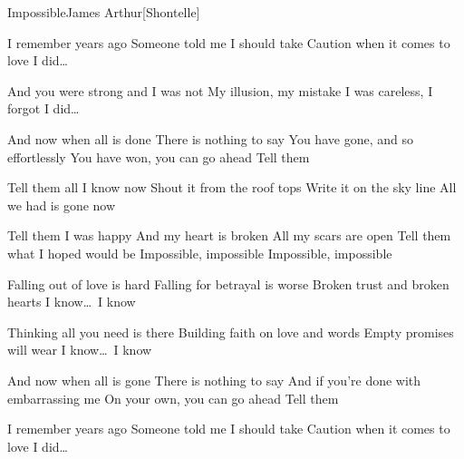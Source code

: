 \begin{Song}{Impossible}{James Arthur}[Shontelle]
\begin{multicols}{2}
\begin{Verse}
I remember years ago
Someone told me I should take
Caution when it comes to love
I did\dots\
\espaceInterStrophe

And you were strong and I was not
My illusion, my mistake
I was careless, I forgot
I did\dots\
\end{Verse}
\espaceInterStrophe

\begin{PreChorus}
And now when all is done
There is nothing to say
You have gone, and so effortlessly
You have won, you can go ahead
Tell them
\end{PreChorus}
\espaceInterStrophe

\begin{Chorus}
Tell them all I know now
Shout it from the roof tops
Write it on the sky line
All we had is gone now
\espaceInterStrophe

Tell them I was happy
And my heart is broken
All my scars are open
Tell them what I hoped would be
Impossible, impossible
Impossible, impossible
\end{Chorus}
\columnbreak

\begin{Verse}
Falling out of love is hard
Falling for betrayal is worse
Broken trust and broken hearts
I know\dots\ I know
\espaceInterStrophe

Thinking all you need is there
Building faith on love and words
Empty promises will wear
I know\dots\ I know
\end{Verse}
\espaceInterStrophe

\begin{PreChorus}
And now when all is gone
There is nothing to say
And if you're done with embarrassing me
On your own, you can go ahead
Tell them
\end{PreChorus}
\espaceInterStrophe

\tochorus
\espaceInterStrophe

\begin{Verse}
I remember years ago
Someone told me I should take
Caution when it comes to love
I did\dots
\end{Verse}
\espaceInterStrophe

\tochorus
\vfill
~
\end{multicols}

\vfill

\begin{multicols}{3}


\end{multicols}
\end{Song}
